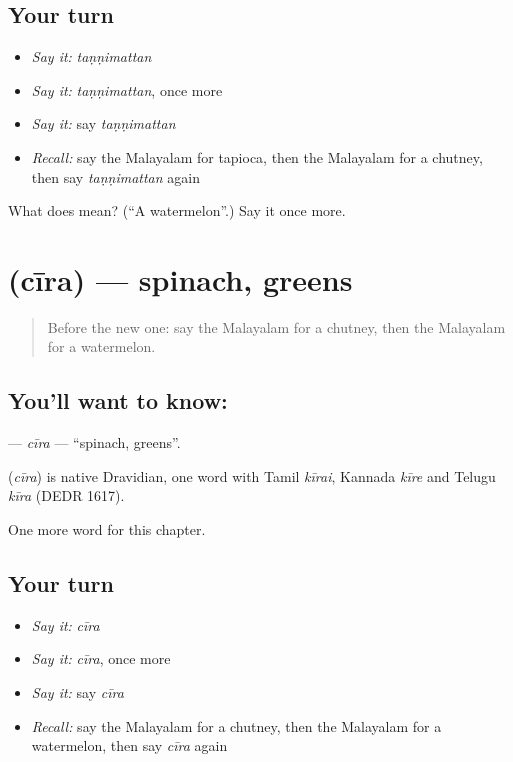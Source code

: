 \subsection*{Your turn}
\begin{itemize}
\raggedright
  \item \emph{Say it:} \emph{taṇṇimattan}
  \item \emph{Say it:} \emph{taṇṇimattan}, once more
  \item \emph{Say it:} say \emph{taṇṇimattan}
  \item \emph{Recall:} say the Malayalam for tapioca, then the Malayalam for a chutney, then say \emph{taṇṇimattan} again
\end{itemize}

\begin{tcolorbox}[breakable,colback=teal!4,colframe=teal!35!black,title={Before you move on}]
What does  mean? (\textquotedblleft{}A watermelon\textquotedblright{}.) Say it once more.
\end{tcolorbox}
\section[\texorpdfstring{\ml{ചീര} (cīra)}{ചീര (cīra)}]{ (cīra) — spinach, greens}

\label{lesson:ML-C323-cira}



\begin{quote}
Before the new one: say the Malayalam for a chutney, then the Malayalam for a watermelon.
\end{quote}

\subsection*{You'll want to know: }
\textbf{} — \emph{cīra} — \textquotedblleft{}spinach, greens\textquotedblright{}.

\begin{cousinweb}
\textbf{} (\emph{cīra}) is native Dravidian, one word with Tamil \emph{kīrai}, Kannada \emph{kīre} and Telugu \emph{kīra} (DEDR 1617).
\end{cousinweb}

\begin{grammarlens}[title={What you've built}]
One more word for this chapter.
\end{grammarlens}

\subsection*{Your turn}
\begin{itemize}
\raggedright
  \item \emph{Say it:} \emph{cīra}
  \item \emph{Say it:} \emph{cīra}, once more
  \item \emph{Say it:} say \emph{cīra}
  \item \emph{Recall:} say the Malayalam for a chutney, then the Malayalam for a watermelon, then say \emph{cīra} again
\end{itemize}

